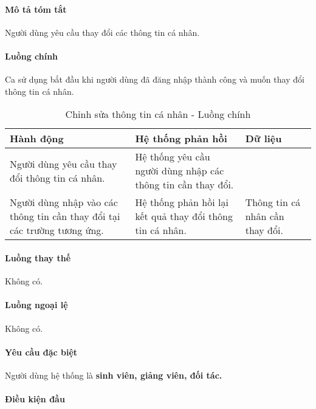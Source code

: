 \documentclass[./../main.tex]{subfiles}
\begin{document}
\paragraph*{Mô tả tóm tắt}

Người dùng yêu cầu thay đổi các thông tin cá nhân.

\paragraph*{Luồng chính} Ca sử dụng bắt đầu khi người dùng đã đăng nhập thành
công và muốn thay đổi thông tin cá nhân.

\begin{table}[H]
  \caption{Chỉnh sửa thông tin cá nhân - Luồng chính}
  \label{tab:update_info}
  \begin{tabularx}{\textwidth}{|X|X|X|}
  \hline
  \textbf{Hành động}                                                       & \textbf{Hệ thống phản hồi}                                   & \textbf{Dữ liệu}                \\ \hline
  Người dùng yêu cầu thay đổi thông tin cá nhân.                           & Hệ thống yêu cầu người dùng nhập các thông tin cần thay đổi. &                                 \\ \hline
  Người dùng nhập vào các thông tin cần thay đổi tại các trường tương ứng. & Hệ thống phản hồi lại kết quả thay đổi thông tin cá nhân.    & Thông tin cá nhân cần thay đổi. \\ \hline
  \end{tabularx}
\end{table}

\paragraph*{Luồng thay thế} Không có.

\paragraph*{Luồng ngoại lệ} Không có.

\paragraph*{Yêu cầu đặc biệt}

Người dùng hệ thống là \textbf{sinh viên, giảng viên, đối tác.}

\paragraph*{Điều kiện đầu}
\end{document}
